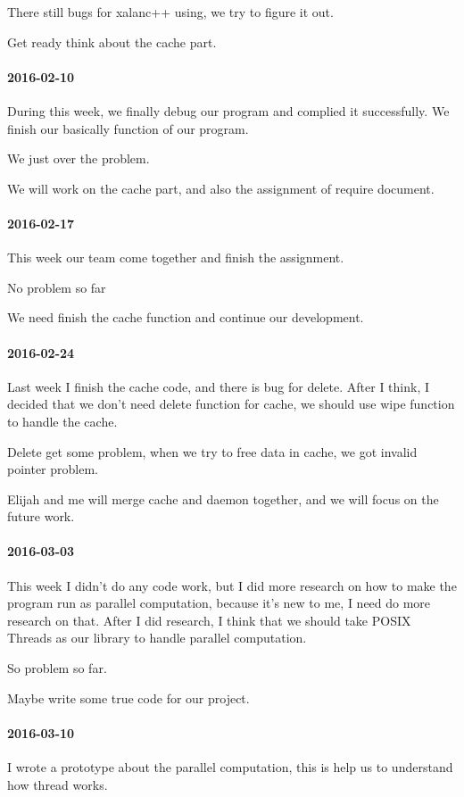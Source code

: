 There still bugs for xalanc++ using, we try to figure it out.


Get ready think about the cache part.

\paragraph{2016-02-10}
During this week, we finally debug our program and complied it successfully. We finish our basically function of our program.


We just over the problem.


We will work on the cache part, and also the assignment of require document.

\paragraph{2016-02-17}
This week our team come together and finish the assignment.


No problem so far


We need finish the cache function and continue our development.

\paragraph{2016-02-24}
Last week I finish the cache code, and there is bug for delete. After I think, I decided that we don't need delete function for cache, we should use wipe function to handle the cache.


Delete get some problem, when we try to free data in cache, we got invalid pointer problem.


Elijah and me will merge cache and daemon together, and we will focus on the future work.


\paragraph{2016-03-03}
This week I didn't do any code work, but I did more research on how to make the program run as parallel computation, because it's new to me, I need do more research on that. After I did research, I think that we should take POSIX Threads as our library to handle parallel computation.


So problem so far.


Maybe write some true code for our project.

\paragraph{2016-03-10}
I wrote a prototype about the parallel computation, this is help us to understand how thread works.


